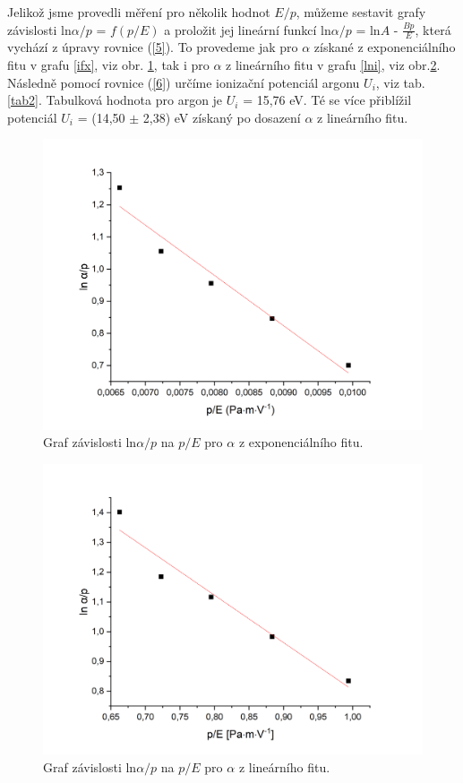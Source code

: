 \documentclass[a4paper,12pt]{article}
\begin{document}
\newpage
Jelikož jsme provedli měření pro několik hodnot $E/p$, můžeme sestavit grafy závislosti ln$\alpha/p$ = $f(p/E)$ a proložit jej lineární funkcí ln$\alpha/p$ = ln$A$ - $\frac{Bp}{E}$, která vychází z úpravy rovnice (\ref{5}). To provedeme jak pro $\alpha$ získané z exponenciálního fitu v grafu \ref{ifx}, viz obr. \ref{exp}, tak i pro $\alpha$ z lineárního fitu v grafu \ref{lni}, viz obr.\ref{lin}. Následně pomocí rovnice (\ref{6}) určíme ionizační potenciál argonu $U_i$, viz tab. \ref{tab2}. Tabulková hodnota pro argon je $U_i$ = 15,76 eV. Té se více přiblížil potenciál $U_i$ = (14,50 $\pm$  2,38) eV získaný po dosazení $\alpha$ z lineárního fitu.
 
 \begin{figure}[h]
 	\centering
 	\includegraphics[width=145mm]{exp.png}
 	\caption{Graf závislosti ln$\alpha/p$ na $p/E$ pro $\alpha$ z exponenciálního fitu.}
 	\label{exp}
 \end{figure}

 \begin{figure}[h]
	\centering
	\includegraphics[width=145mm]{lin.png}
	\caption{Graf závislosti ln$\alpha/p$ na $p/E$ pro $\alpha$ z lineárního fitu.}
	\label{lin}
\end{figure}
 
\end{document}
